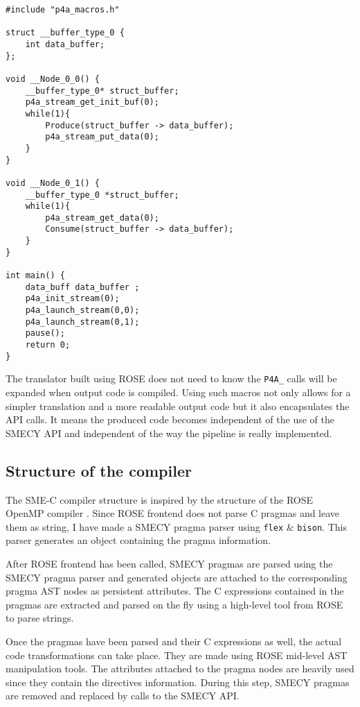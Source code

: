 \documentclass[a4paper]{article}
\begin{document}
	\begin{lstlisting}[label=macros,caption={Streaming output code with
macro calls. The definitions of \texttt{Produce} and \texttt{Consume} functions are not shown.}]
#include "p4a_macros.h" 

struct __buffer_type_0 {
	int data_buffer;
};

void __Node_0_0() {
	__buffer_type_0* struct_buffer;
	p4a_stream_get_init_buf(0);
	while(1){
		Produce(struct_buffer -> data_buffer);
		p4a_stream_put_data(0);
	}
}

void __Node_0_1() {
	__buffer_type_0 *struct_buffer;
	while(1){
		p4a_stream_get_data(0);
		Consume(struct_buffer -> data_buffer);
	}
}

int main() {
	data_buff data_buffer ;
	p4a_init_stream(0);
	p4a_launch_stream(0,0);
	p4a_launch_stream(0,1);
	pause();
	return 0;
}
	\end{lstlisting}

	The translator built using ROSE does not need to know the \verb+P4A_+
    calls will be expanded when output code is compiled. Using such macros
    not only allows for a simpler translation and a more readable output
    code but it also encapsulates the API calls. It means the produced
    code becomes independent of the use of the SMECY API and independent
    of the way the pipeline is really implemented.

	\subsection{Structure of the compiler}
	The SME-C compiler structure is inspired by the structure of the ROSE OpenMP compiler \cite{roseomp}. Since ROSE frontend does not parse C pragmas and leave them as string, I have made a SMECY pragma parser using \texttt{flex} \& \texttt{bison}. This parser generates an object containing the pragma information.
	
	After ROSE frontend has been called, SMECY pragmas are parsed using the SMECY pragma parser and generated objects are attached to the corresponding pragma AST nodes as persistent attributes. The C expressions contained in the pragmas are extracted and parsed on the fly using a high-level tool from ROSE to parse strings.
	
	Once the pragmas have been parsed and their C expressions as well, the actual code transformations can take place. They are made using ROSE mid-level AST manipulation tools. The attributes attached to the pragma nodes are heavily used since they contain the directives information. During this step, SMECY pragmas are removed and replaced by calls to the SMECY API.
	
\end{document}
